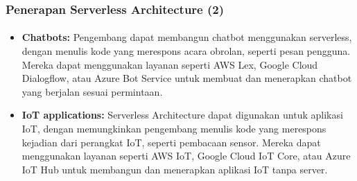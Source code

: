 \documentclass[aspectratio=169, table]{beamer}
\begin{document}
	\begin{frame}\frametitle{Penerapan Serverless Architecture (2)}
		\framesubtitle{\hspace{1cm}}
		\begin{itemize}
			\item \textbf{Chatbots:} Pengembang dapat membangun chatbot menggunakan serverless, dengan menulis kode yang merespons acara obrolan, seperti pesan pengguna. Mereka dapat menggunakan layanan seperti AWS Lex, Google Cloud Dialogflow, atau Azure Bot Service untuk membuat dan menerapkan chatbot yang berjalan sesuai permintaan.
			\item \textbf {IoT applications:} Serverless Architecture dapat digunakan untuk aplikasi IoT, dengan memungkinkan pengembang menulis kode yang merespons kejadian dari perangkat IoT, seperti pembacaan sensor. Mereka dapat menggunakan layanan seperti AWS IoT, Google Cloud IoT Core, atau Azure IoT Hub untuk membangun dan menerapkan aplikasi IoT tanpa server.
		\end{itemize}
	\end{frame}
\end{document}
